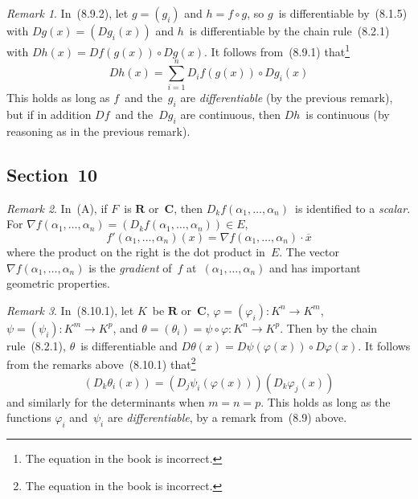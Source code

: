 \documentclass[letterpaper,12pt]{article}
\newcommand{\R}{\mathbf{R}}
\newcommand{\C}{\mathbf{C}}
\newcommand{\after}{\circ}
\newcommand{\grad}{\nabla}
\newcommand{\conj}[1]{\overline{#1}}
\theoremstyle{plain}
\theoremstyle{definition}
\theoremstyle{remark}
\newtheorem*{rmk}{Remark}
\begin{document}
\begin{rmk}
In~(8.9.2), let \(g=(g_i)\) and \(h=f\after g\), so \(g\)~is differentiable by~(8.1.5) with \(Dg(x)=(Dg_i(x))\) and \(h\)~is differentiable by the chain rule~(8.2.1) with \(Dh(x)=Df(g(x))\after Dg(x)\). It follows from~(8.9.1) that\footnote{The equation in the book is incorrect.}
\[Dh(x)=\sum_{i=1}^nD_if(g(x))\after Dg_i(x)\]
This holds as long as \(f\)~and the~\(g_i\) are \emph{differentiable} (by the previous remark), but if in addition \(Df\)~and the~\(Dg_i\) are continuous, then \(Dh\)~is continuous (by reasoning as in the previous remark).
\end{rmk}

\subsection*{Section~10}
\begin{rmk}
In~(A), if \(F\)~is \(\R\) or~\(\C\), then \(D_kf(\alpha_1,\ldots,\alpha_n)\)~is identified to a \emph{scalar}. For \(\grad f(\alpha_1,\ldots,\alpha_n)=(D_kf(\alpha_1,\ldots,\alpha_n))\in E\),
\[f'(\alpha_1,\ldots,\alpha_n)(x)=\grad f(\alpha_1,\ldots,\alpha_n)\cdot\conj{x}\]
where the product on the right is the dot product in~\(E\). The vector \(\grad f(\alpha_1,\ldots,\alpha_n)\) is the \emph{gradient} of~\(f\) at~\((\alpha_1,\ldots,\alpha_n)\) and has important geometric properties.
\end{rmk}

\begin{rmk}
In~(8.10.1), let \(K\)~be \(\R\) or~\(\C\), \(\varphi=(\varphi_i):K^n\to K^m\), \(\psi=(\psi_i):K^m\to K^p\), and \(\theta=(\theta_i)=\psi\after\varphi:K^n\to K^p\). Then by the chain rule~(8.2.1), \(\theta\)~is differentiable and \(D\theta(x)=D\psi(\varphi(x))\after D\varphi(x)\). It follows from the remarks above~(8.10.1) that\footnote{The equation in the book is incorrect.}
\[(D_k\theta_i(x))=(D_j\psi_i(\varphi(x)))(D_k\varphi_j(x))\]
and similarly for the determinants when \(m=n=p\). This holds as long as the functions \(\varphi_i\) and~\(\psi_i\) are \emph{differentiable}, by a remark from~(8.9) above.
\end{rmk}
\end{document}
